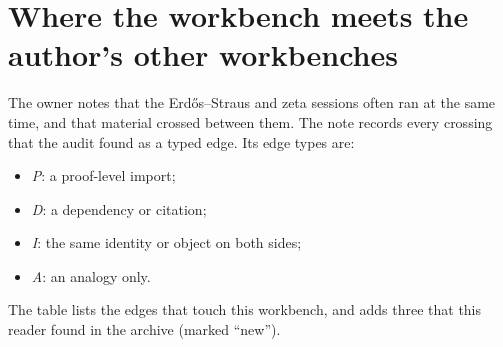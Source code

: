 \section{Where the workbench meets the author's other workbenches}\label{sec:overlaps}

The owner notes that the Erdős--Straus and zeta sessions often ran at the same time, and that material crossed between them. The note  records every crossing that the audit found as a typed edge. Its edge types are:
\begin{itemize}
\item \emph{P}: a proof-level import;
\item \emph{D}: a dependency or citation;
\item \emph{I}: the same identity or object on both sides;
\item \emph{A}: an analogy only.
\end{itemize}
The table lists the edges that touch this workbench, and adds three that this reader found in the archive (marked ``new'').

